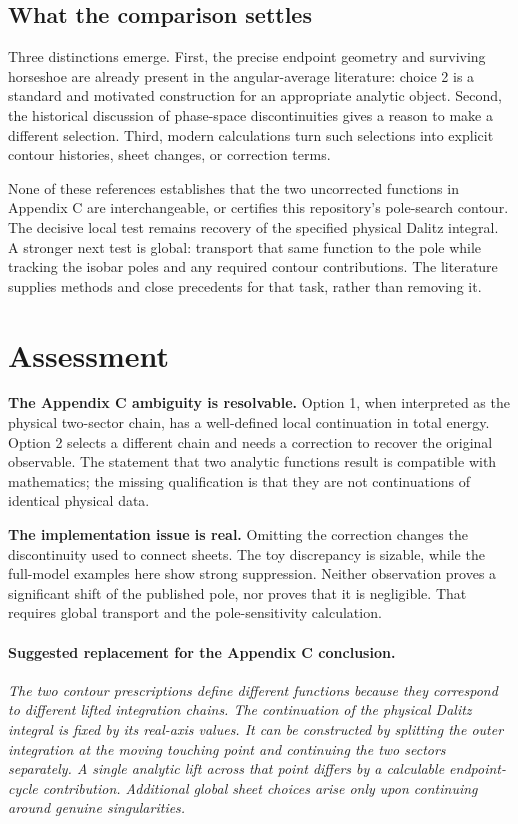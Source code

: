 \documentclass[11pt,a4paper]{article}
\begin{document}
\subsection{What the comparison settles}
Three distinctions emerge. First, the precise endpoint geometry and surviving horseshoe are already present in the angular-average literature: choice 2 is a standard and motivated construction for an appropriate analytic object. Second, the historical discussion of phase-space discontinuities gives a reason to make a different selection. Third, modern calculations turn such selections into explicit contour histories, sheet changes, or correction terms.

None of these references establishes that the two uncorrected functions in Appendix C are interchangeable, or certifies this repository's pole-search contour. The decisive local test remains recovery of the specified physical Dalitz integral. A stronger next test is global: transport that same function to the pole while tracking the isobar poles and any required contour contributions. The literature supplies methods and close precedents for that task, rather than removing it.
\FloatBarrier

\section{Assessment}
\textbf{The Appendix C ambiguity is resolvable.} Option 1, when interpreted as the physical two-sector chain, has a well-defined local continuation in total energy. Option 2 selects a different chain and needs a correction to recover the original observable. The statement that two analytic functions result is compatible with mathematics; the missing qualification is that they are not continuations of identical physical data.

\textbf{The implementation issue is real.} Omitting the correction changes the discontinuity used to connect sheets. The toy discrepancy is sizable, while the full-model examples here show strong suppression. Neither observation proves a significant shift of the published pole, nor proves that it is negligible. That requires global transport and the pole-sensitivity calculation.

\paragraph{Suggested replacement for the Appendix C conclusion.}
\emph{The two contour prescriptions define different functions because they correspond to different lifted integration chains. The continuation of the physical Dalitz integral is fixed by its real-axis values. It can be constructed by splitting the outer integration at the moving touching point and continuing the two sectors separately. A single analytic lift across that point differs by a calculable endpoint-cycle contribution. Additional global sheet choices arise only upon continuing around genuine singularities.}
\end{document}
